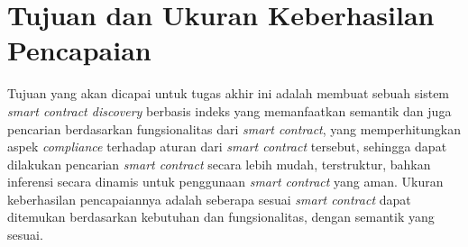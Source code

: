 


\section{Tujuan dan Ukuran Keberhasilan Pencapaian}
\label{sec:tujuan-ukuran-keberhasilan-pencapaian}


Tujuan yang akan dicapai untuk tugas akhir ini adalah membuat sebuah sistem \textit{smart contract discovery} berbasis indeks yang memanfaatkan semantik dan juga pencarian berdasarkan fungsionalitas dari \textit{smart contract}, yang memperhitungkan aspek \textit{compliance} terhadap aturan dari \textit{smart contract} tersebut, sehingga dapat dilakukan pencarian \textit{smart contract} secara lebih mudah, terstruktur, bahkan inferensi secara dinamis untuk penggunaan \textit{smart contract} yang aman. Ukuran keberhasilan pencapaiannya adalah seberapa sesuai \textit{smart contract} dapat ditemukan berdasarkan kebutuhan dan fungsionalitas, dengan semantik yang sesuai.

